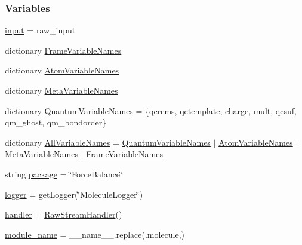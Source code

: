 \subsubsection*{Variables}
\begin{DoxyCompactItemize}
\item 
\hyperlink{namespacesrc_1_1molecule_a24a2611c587c2e6cf9597e87bdeba703}{input} = raw\+\_\+input
\item 
dictionary \hyperlink{namespacesrc_1_1molecule_a16f4e1ba169d954ce12d9217c121305f}{Frame\+Variable\+Names}
\item 
dictionary \hyperlink{namespacesrc_1_1molecule_a3c3c0e8c5e0c2a020713e1d7beba5269}{Atom\+Variable\+Names}
\item 
dictionary \hyperlink{namespacesrc_1_1molecule_a4c6798b828fd919cc79a5d8193e8928a}{Meta\+Variable\+Names}
\item 
dictionary \hyperlink{namespacesrc_1_1molecule_a63e784c5358f77bcf929f5f5a312b845}{Quantum\+Variable\+Names} = \{\textquotesingle{}qcrems\textquotesingle{}, \textquotesingle{}qctemplate\textquotesingle{}, \textquotesingle{}charge\textquotesingle{}, \textquotesingle{}mult\textquotesingle{}, \textquotesingle{}qcsuf\textquotesingle{}, \textquotesingle{}qm\+\_\+ghost\textquotesingle{}, \textquotesingle{}qm\+\_\+bondorder\textquotesingle{}\}
\item 
dictionary \hyperlink{namespacesrc_1_1molecule_a9b73a8b86c4764462fb2c724062624a9}{All\+Variable\+Names} = \hyperlink{namespacesrc_1_1molecule_a63e784c5358f77bcf929f5f5a312b845}{Quantum\+Variable\+Names} $\vert$ \hyperlink{namespacesrc_1_1molecule_a3c3c0e8c5e0c2a020713e1d7beba5269}{Atom\+Variable\+Names} $\vert$ \hyperlink{namespacesrc_1_1molecule_a4c6798b828fd919cc79a5d8193e8928a}{Meta\+Variable\+Names} $\vert$ \hyperlink{namespacesrc_1_1molecule_a16f4e1ba169d954ce12d9217c121305f}{Frame\+Variable\+Names}
\item 
string \hyperlink{namespacesrc_1_1molecule_a9af903d1a1ea8401cdc4c872a088ce48}{package} = \char`\"{}Force\+Balance\char`\"{}
\item 
\hyperlink{namespacesrc_1_1molecule_a3d3f329e9dbef8c64d056e17c705fe32}{logger} = get\+Logger(\char`\"{}Molecule\+Logger\char`\"{})
\item 
\hyperlink{namespacesrc_1_1molecule_abab499318f0c74dd01f75494c609e720}{handler} = \hyperlink{classsrc_1_1molecule_1_1RawStreamHandler}{Raw\+Stream\+Handler}()
\item 
\hyperlink{namespacesrc_1_1molecule_ad5301fb2ee3b4c9aa0be3dba89f2d30e}{module\+\_\+name} = \+\_\+\+\_\+name\+\_\+\+\_\+.\+replace(\textquotesingle{}.molecule\textquotesingle{},\textquotesingle{}\textquotesingle{})

\end{DoxyCompactItemize}
